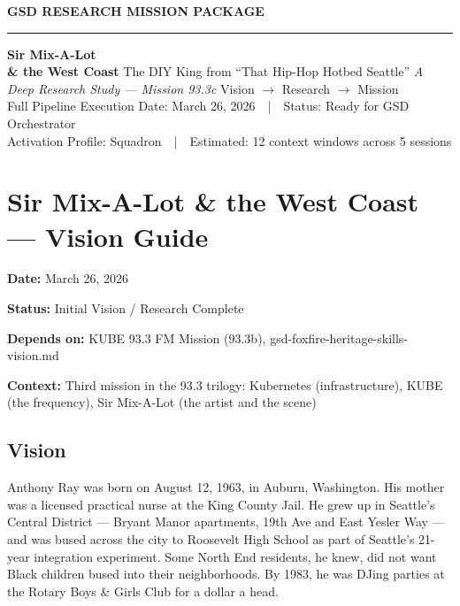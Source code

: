 \documentclass[11pt,letterpaper]{article}
\newcommand{\stageheader}[2]{\noindent\colorbox{#2}{\makebox[\textwidth][l]{\textcolor{white}{\bfseries\sffamily\hspace{6pt}#1\hspace{6pt}}}}\vspace{0.5em}\par}
\newcommand{\metafield}[2]{\textbf{\sffamily #1} #2\par}
\begin{document}
\thispagestyle{empty}
\begin{center}
\vspace*{3cm}
{\small\sffamily\textcolor{primary}{\textbf{GSD RESEARCH MISSION PACKAGE}}}
\vspace{0.3cm}
\textcolor{bordergray}{\rule{8cm}{0.4pt}}
\vspace{1.5cm}
{\fontsize{28}{34}\selectfont\bfseries\sffamily\textcolor{primary}{Sir Mix-A-Lot\\[0.3em]\& the West Coast}}
\vspace{0.8cm}
{\Large\sffamily\textcolor{secondary}{The DIY King from ``That Hip-Hop Hotbed Seattle''}}
\vspace{0.5cm}
{\large\sffamily\itshape\textcolor{tertiary}{A Deep Research Study --- Mission 93.3c}}
\vspace{3cm}
{\sffamily\textcolor{accent}{Vision $\rightarrow$ Research $\rightarrow$ Mission}}\\[0.3em]
{\small\sffamily\textcolor{accent}{Full Pipeline Execution}}
\vspace{3cm}
{\small\sffamily\textcolor{subtlegray}{Date: March 26, 2026~~|~~Status: Ready for GSD Orchestrator}}\\[0.3em]
{\small\sffamily\textcolor{subtlegray}{Activation Profile: Squadron~~|~~Estimated: 12 context windows across 5 sessions}}
\end{center}
\newpage

\tableofcontents
\newpage

\stageheader{STAGE 1 --- VISION DOCUMENT}{primary}

\section{Sir Mix-A-Lot \& the West Coast --- Vision Guide}

\metafield{Date:}{March 26, 2026}
\metafield{Status:}{Initial Vision / Research Complete}
\metafield{Depends on:}{KUBE 93.3 FM Mission (93.3b), gsd-foxfire-heritage-skills-vision.md}
\metafield{Context:}{Third mission in the 93.3 trilogy: Kubernetes (infrastructure), KUBE (the frequency), Sir Mix-A-Lot (the artist and the scene)}

\subsection{Vision}

Anthony Ray was born on August 12, 1963, in Auburn, Washington. His mother was a licensed practical nurse at the King County Jail. He grew up in Seattle's Central District --- Bryant Manor apartments, 19th Ave and East Yesler Way --- and was bused across the city to Roosevelt High School as part of Seattle's 21-year integration experiment. Some North End residents, he knew, did not want Black children bused into their neighborhoods. By 1983, he was DJing parties at the Rotary Boys \& Girls Club for a dollar a head.
\end{document}
